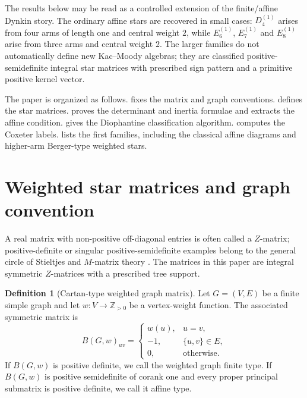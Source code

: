 \documentclass[11pt,a4paper]{article}
\newcommand{\ZZ}{\mathbb Z}
\theoremstyle{definition}
\newtheorem{definition}{Definition}[section]
\theoremstyle{plain}
\begin{document}
The results below may be read as a controlled extension of the finite/affine Dynkin story.  The ordinary affine stars are recovered in small cases: $D_4^{(1)}$ arises from four arms of length one and central weight $2$, while $E_6^{(1)}$, $E_7^{(1)}$ and $E_8^{(1)}$ arise from three arms and central weight $2$.  The larger families do not automatically define new Kac--Moody algebras; they are classified positive-semidefinite integral star matrices with prescribed sign pattern and a primitive positive kernel vector.

The paper is organized as follows.   fixes the matrix and graph conventions.   defines the star matrices.   proves the determinant and inertia formulae and extracts the affine condition.   gives the Diophantine classification algorithm.   computes the Coxeter labels.   lists the first families, including the classical affine diagrams and higher-arm Berger-type weighted stars.

\section{Weighted star matrices and graph convention}
\label{sec:framework}

A real matrix with non-positive off-diagonal entries is often called a $Z$-matrix; positive-definite or singular positive-semidefinite examples belong to the general circle of Stieltjes and $M$-matrix theory \citep{BermanPlemmons1994,HornJohnson2013}.  The matrices in this paper are integral symmetric $Z$-matrices with a prescribed tree support.

\begin{definition}[Cartan-type weighted graph matrix]
Let $G=(V,E)$ be a finite simple graph and let $w:V\to\ZZ_{>0}$ be a vertex-weight function.  The associated symmetric matrix is
\begin{equation}
        B(G,w)_{uv}=\begin{cases}
        w(u), & u=v,\\
        -1, & \{u,v\}\in E,\\
        0, & \text{otherwise.}
        \end{cases}
\label{eq:weighted-graph-matrix}
\end{equation}
If $B(G,w)$ is positive definite, we call the weighted graph finite type.  If $B(G,w)$ is positive semidefinite of corank one and every proper principal submatrix is positive definite, we call it affine type.
\end{definition}
\end{document}
